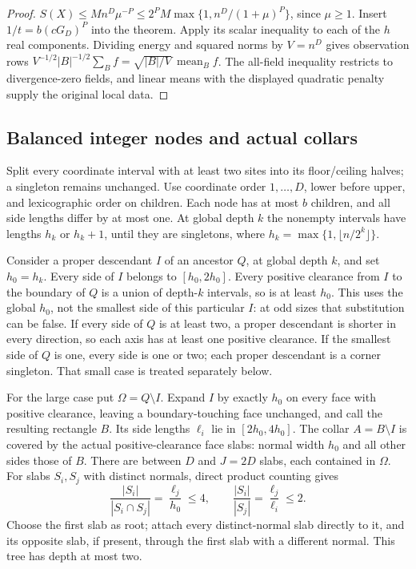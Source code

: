 \begin{proof}
$S(X)\le Mn^D\mu^{-P}\le2^PM\max\{1,n^D/(1+\mu)^P\}$, since
$\mu\ge1$. Insert $1/t=b(cG_D)^P$ into the theorem. Apply its scalar
inequality to each of the $h$ real components. Dividing energy and squared
norms by $V=n^D$ gives observation rows
$V^{-1/2}|B|^{-1/2}\sum_B f=\sqrt{|B|/V}\,\operatorname{mean}_B f$.
The all-field inequality restricts to divergence-zero fields, and linear
means with the displayed quadratic penalty supply the original local data.
\end{proof}

\subsection{Balanced integer nodes and actual collars}
Split every coordinate interval with at least two sites into its floor/ceiling
halves; a singleton remains unchanged. Use coordinate order $1,\ldots,D$,
lower before upper, and lexicographic order on children. Each node has at
most $b$ children, and all side lengths differ by at most one. At global
depth $k$ the nonempty intervals have lengths $h_k$ or $h_k+1$, until they
are singletons, where $h_k=\max\{1,\lfloor n/2^k\rfloor\}$.

Consider a proper descendant $I$ of an ancestor $Q$, at global depth $k$,
and set $h_0=h_k$. Every side of $I$ belongs to $[h_0,2h_0]$.
Every positive clearance from $I$ to the boundary of $Q$ is a union of
depth-$k$ intervals, so is at least $h_0$. This uses the global $h_0$,
not the smallest side of this particular $I$: at odd sizes that substitution
can be false. If every side of $Q$ is at least two, a proper descendant
is shorter in every direction, so each axis has at least one positive
clearance. If the smallest side of $Q$ is one, every side is one or two;
each proper descendant is a corner singleton. That small case is treated
separately below.

For the large case put $\Omega=Q\setminus I$. Expand $I$ by exactly $h_0$
on every face with positive clearance, leaving a boundary-touching face
unchanged, and call the resulting rectangle $B$. Its side lengths $\ell_i$
lie in $[2h_0,4h_0]$. The collar $A=B\setminus I$ is covered by the actual
positive-clearance face slabs: normal width $h_0$ and all other sides those
of $B$. There are between $D$ and $J=2D$ slabs, each contained in $\Omega$.
For slabs $S_i,S_j$ with distinct normals, direct product counting gives
\begin{equation}\label{eq:balanced223-overlap}
 \frac{|S_i|}{|S_i\cap S_j|}=\frac{\ell_j}{h_0}\le4,
 \qquad \frac{|S_i|}{|S_j|}=\frac{\ell_j}{\ell_i}\le2.
\end{equation}
Choose the first slab as root; attach every distinct-normal slab directly
to it, and its opposite slab, if present, through the first slab with a
different normal. This tree has depth at most two.

